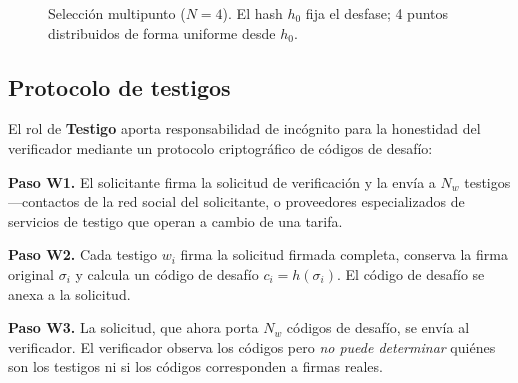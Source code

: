 \documentclass[11pt,a4paper,twocolumn]{article}
\begin{document}
\begin{figure}[ht]
\centering
{}
\caption{Selección multipunto ($N{=}4$). El hash $h_0$ fija el desfase; 4 puntos distribuidos de forma uniforme desde $h_0$.}
\label{fig:multipoint}
\end{figure}

\subsection{Protocolo de testigos}

El rol de \textbf{Testigo} aporta responsabilidad de incógnito para la honestidad del verificador mediante un protocolo criptográfico de códigos de desafío:

\textbf{Paso W1.} El solicitante firma la solicitud de verificación y la envía a $N_w$ testigos---contactos de la red social del solicitante, o proveedores especializados de servicios de testigo que operan a cambio de una tarifa.

\textbf{Paso W2.} Cada testigo $w_i$ firma la solicitud firmada completa, conserva la firma original $\sigma_i$ y calcula un código de desafío $c_i = h(\sigma_i)$. El código de desafío se anexa a la solicitud.

\textbf{Paso W3.} La solicitud, que ahora porta $N_w$ códigos de desafío, se envía al verificador. El verificador observa los códigos pero \emph{no puede determinar} quiénes son los testigos ni si los códigos corresponden a firmas reales.
\end{document}
